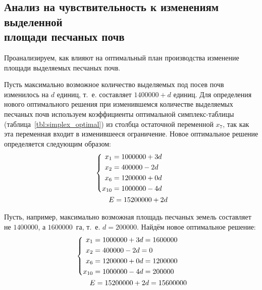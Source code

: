 

\subsection[Анализ на чувствительность к изменениям выделенной \\ площади песчаных почв]{Анализ на чувствительность к изменениям выделенной \\ площади песчаных почв}

Проанализируем, как влияют на оптимальный план производства изменение площади выделяемых песчаных почв.

Пусть максимально возможное количество выделяемых под посев почв изменилось на $ d $ единиц, т.~е. составляет $ 1 400 000 + d $ единиц. Для определения нового оптимального решения при изменившемся количестве выделяемых песчаных почв используем коэффициенты оптимальной симплекс-таблицы (таблица~\ref{tbl:simplex_optimal}) из столбца остаточной переменной $ x_7 $, так как эта переменная входит в изменившееся ограничение. Новое оптимальное решение определяется следующим образом:
\begin{equation}
\label{eq:analysis_first}
	\begin{aligned}
  	&\left\{
    	\begin{aligned}
	      x_1 & = 1 000 000 + 3d \\
	      x_2 & = 400 000 - 2d \\
	      x_6 & = 1 200 000 + 0d \\
	      x_{10} & = 1 000 000 - 4d \\ 
    	\end{aligned}
  	\right.
  	\\
  	& \hspace{7mm} E = 15 200 000 + 2d
	\end{aligned}
\end{equation}

Пусть, например, максимально возможная площадь песчаных земель составляет не $ 1 400 000 $, а $ 1 600 000 $~га, т.~е. $ d = 200 000 $. Найдём новое оптимальное решение:
\begin{equation}
\label{eq:analysis_first_result}
	\begin{aligned}
  	&\left\{
    	\begin{aligned}
	      x_1 & = 1 000 000 + 3d = 1 600 000 \\
	      x_2 & = 400 000 - 2d = 0\\
	      x_6 & = 1 200 000 + 0d = 1 200 000 \\
	      x_{10} & = 1 000 000 - 4d = 200 000\\ 
    	\end{aligned}
  	\right.
  	\\
  	& \hspace{7mm} E = 15 200 000 + 2d = 15 600 000
	\end{aligned}
\end{equation}

